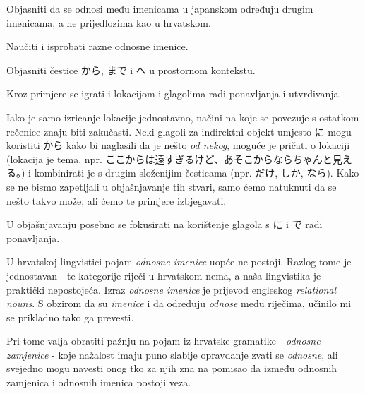 
\author{Tomislav Mamić}

	
	
	\begin{hyou}
		\item Objasniti da se odnosi među imenicama u japanskom određuju drugim imenicama, a ne prijedlozima kao u hrvatskom.
		\item Naučiti i isprobati razne odnosne imenice.
		\item Objasniti čestice から, まで i へ u prostornom kontekstu.
		\item Kroz primjere se igrati i lokacijom i glagolima radi ponavljanja i utvrđivanja.
	\end{hyou}

	
	\begin{hyou}
		\item Iako je samo izricanje lokacije jednostavno, načini na koje se povezuje s ostatkom rečenice znaju biti zakučasti. Neki glagoli za indirektni objekt umjesto に mogu koristiti から kako bi naglasili da je nešto \textit{od nekog}, moguće je pričati o lokaciji (lokacija je tema, npr. ここからは遠すぎるけど、あそこからならちゃんと見える。) i kombinirati je s drugim složenijim česticama (npr. だけ, しか, なら). Kako se ne bismo zapetljali u objašnjavanje tih stvari, samo ćemo natuknuti da se nešto takvo može, ali ćemo te primjere izbjegavati.
		\item U objašnjavanju posebno se fokusirati na korištenje glagola s に i で radi ponavljanja.
	\end{hyou}

	
	U hrvatskoj lingvistici pojam \textit{odnosne imenice} uopće ne postoji. Razlog tome je jednostavan - te kategorije riječi u hrvatskom nema, a naša lingvistika je praktički nepostojeća. Izraz \textit{odnosne imenice} je prijevod engleskog \textit{relational nouns}. S obzirom da su \textit{imenice} i da određuju \textit{odnose} među riječima, učinilo mi se prikladno tako ga prevesti.
	
	Pri tome valja obratiti pažnju na pojam iz hrvatske gramatike - \textit{odnosne zamjenice} - koje nažalost imaju puno slabije opravdanje zvati se \textit{odnosne}, ali svejedno mogu navesti onog tko za njih zna na pomisao da između odnosnih zamjenica i odnosnih imenica postoji veza.
